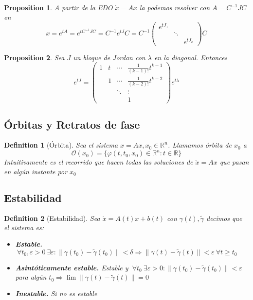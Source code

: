 \documentclass[leqno]{article}
\newtheorem*{proposition}{Proposition}
\newtheorem*{definition}{Definition}
\begin{document}
\begin{proposition}
  A partir de la EDO $\dot{x} = Ax$ la podemos resolver con  $A= C^{-1}JC$ en
  \[
	x = e^{tA} = e^{tC^{-1}JC} = C^{-1}e^{tJ}C = C^{-1} \begin{pmatrix} e^{tJ_1} & & \\ & \ddots & \\ & & e^{tJ_k} \end{pmatrix} C
  \] 
\end{proposition}

\begin{proposition}
Sea $J$ un bloque de Jordan con  $\lambda$ en la diagonal. Entonces
\[
  e^{tJ} = \begin{pmatrix} 1 & t & \cdots & \frac{1}{(k-1)!}t^{k-1} \\ & 1 & \cdots & \frac{1}{(k-2)!}t^{k-2} \\ & & \ddots & \vdots \\ & & & 1  \end{pmatrix}  e^{t\lambda}
\] 
\end{proposition}

\subsection{Órbitas y Retratos de fase}

\begin{definition}[Órbita] Sea el sistema $\dot{x}=Ax, x_0\in \mathbb{R}^n$. Llamamos órbita de $x_0$ a
   \[
  \mathcal{O}(x_0) = \{\varphi (t, t_0, x_0)\in \mathbb{R}^n : t \in \mathbb{R}\}
  \] 
  Intuitivamente es el recorrido que hacen todas las soluciones de $\dot{x}=Ax$ que pasan en algún instante por $x_0$

\end{definition}

\subsection{Estabilidad}

\begin{definition}[Estabilidad] Sea $\dot{x}=A(t)x+b(t)$ con $\gamma(t), \tilde{\gamma}$ decimos que el sistema es:
  \begin{itemize}[topsep=-6pt, itemsep=0pt]
    \item \textbf{Estable.} $\ \forall t_0, \varepsilon >0 \ \exists \varepsilon : \|\gamma(t_0)-\tilde{\gamma}(t_0)\|<\delta \Rightarrow \|\gamma(t)-\tilde{\gamma}(t)\|<\varepsilon \ \forall t\ge t_0$
 \item \textbf{Asintóticamente estable.} Estable y $\ \forall t_0 \ \exists \varepsilon >0: \|\gamma(t_0)-\tilde{\gamma}(t_0)\|<\varepsilon$ para algún $t_0 \Rightarrow \lim \|\gamma(t)-\tilde{\gamma}(t)\| =0$
   \item \textbf{Inestable.} Si no es estable
  \end{itemize}
\end{definition}
\end{document}

